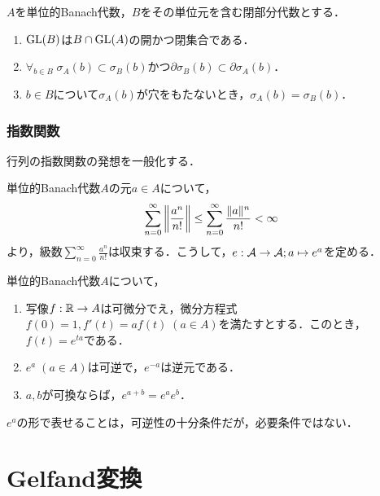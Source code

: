 \documentclass[uplatex,dvipdfmx]{jsreport}
\begin{document}
\begin{theorem}[閉部分代数のスペクトル]
    $A$を単位的Banach代数，$B$をその単位元を含む閉部分代数とする．
    \begin{enumerate}
        \item $\mathrm{GL}(B)$は$B\cap\mathrm{GL}(A)$の開かつ閉集合である．
        \item $\forall_{b\in B}\;\sigma_A(b)\subset\sigma_B(b)$かつ$\partial\sigma_B(b)\subset\partial\sigma_A(b)$．
        \item $b\in B$について$\sigma_A(b)$が穴をもたないとき，$\sigma_A(b)=\sigma_B(b)$．
    \end{enumerate}
\end{theorem}

\subsubsection{指数関数}

\begin{tcolorbox}[colframe=ForestGreen, colback=ForestGreen!10!white,breakable,colbacktitle=ForestGreen!40!white,coltitle=black,fonttitle=\bfseries\sffamily,
title=]
    行列の指数関数の発想を一般化する．
\end{tcolorbox}

\begin{notation}\label{not-extended-exp}
    単位的Banach代数$A$の元$a\in A$について，
    \[\sum^\infty_{n=0}\left\|\frac{a^n}{n!}\right\|\le\sum^\infty_{n=0}\frac{\|a\|^n}{n!}<\infty\]
    より，級数$\sum^\infty_{n=0}\frac{a^n}{n!}$は収束する．こうして，$e:\mathcal{A}\to\mathcal{A};a\mapsto e^a$を定める．
\end{notation}

\begin{theorem}
    単位的Banach代数$A$について，
    \begin{enumerate}
        \item 写像$f:\mathbb{R}\to A$は可微分でえ，微分方程式$f(0)=1,f'(t)=af(t)\;(a\in A)$を満たすとする．このとき，$f(t)=e^{ta}$である．
        \item $e^a\;(a\in A)$は可逆で，$e^{-a}$は逆元である．
        \item $a,b$が可換ならば，$e^{a+b}=e^ae^b$．
    \end{enumerate}
\end{theorem}
\begin{remark}
    $e^a$の形で表せることは，可逆性の十分条件だが，必要条件ではない．
\end{remark}

\section{Gelfand変換}
\end{document}
